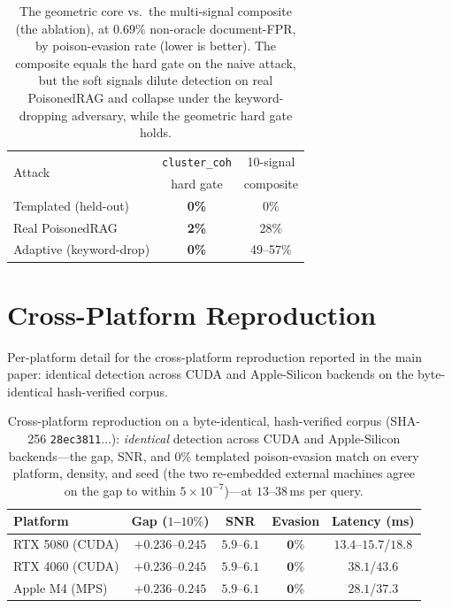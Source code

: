 \documentclass[lettersize,journal]{IEEEtran}
\begin{document}
\begin{table}[H]
\centering
\caption{The geometric core vs.\ the multi-signal composite (the ablation), at
$0.69\%$ non-oracle document-FPR, by poison-evasion rate (lower is better). The
composite equals the hard gate on the naive attack, but the soft signals dilute
detection on real PoisonedRAG and collapse under the keyword-dropping adversary,
while the geometric hard gate holds.}
\label{tab:core}
\begin{tabular}{lcc}
\toprule
\multirow{2}{*}{Attack} & \texttt{cluster\_coh} & 10-signal \\
       & hard gate & composite \\
\midrule
Templated (held-out)    & \textbf{0\%} & 0\% \\
Real PoisonedRAG        & \textbf{2\%} & 28\% \\
Adaptive (keyword-drop) & \textbf{0\%} & 49--57\% \\
\bottomrule
\end{tabular}
\end{table}

\section{Cross-Platform Reproduction}
\label{app:xplat}
Per-platform detail for the cross-platform reproduction reported in the main paper: identical detection across CUDA and Apple-Silicon backends on the byte-identical hash-verified corpus.

\begin{table}[H]
\centering
\scriptsize
\setlength{\tabcolsep}{3pt}
\caption{Cross-platform reproduction on a byte-identical, hash-verified corpus (SHA-256
\texttt{28ec3811}$\dots$): \emph{identical} detection across CUDA and Apple-Silicon
backends---the gap, SNR, and $0\%$ templated poison-evasion match on every platform,
density, and seed (the two re-embedded external machines agree on the gap to within
$5\times10^{-7}$)---at $13$--$38$\,ms per query.}
\label{tab:xplat}
\begin{tabular}{lcccc}
\toprule
Platform & Gap ($1$--$10\%$) & SNR & Evasion & Latency (ms) \\
\midrule
RTX 5080 (CUDA) & $+0.236$--$0.245$ & $5.9$--$6.1$ & $\mathbf{0\%}$ & $13.4$--$15.7$/$18.8$ \\
RTX 4060 (CUDA) & $+0.236$--$0.245$ & $5.9$--$6.1$ & $\mathbf{0\%}$ & $38.1$/$43.6$ \\
Apple M4 (MPS) & $+0.236$--$0.245$ & $5.9$--$6.1$ & $\mathbf{0\%}$ & $28.1$/$37.3$ \\
\bottomrule
\end{tabular}
\end{table}
\end{document}
